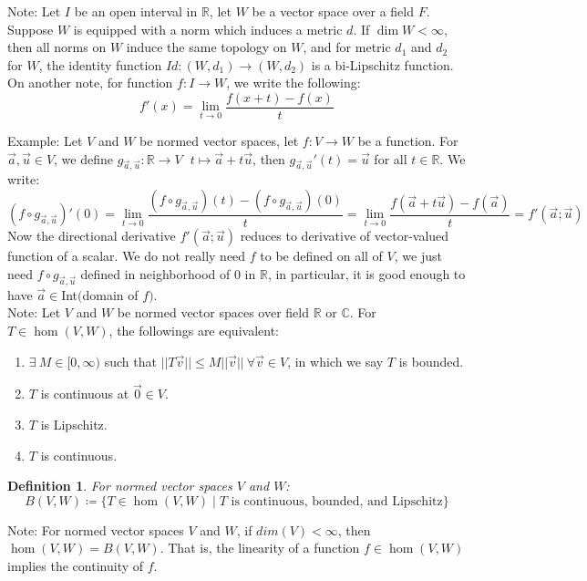 \documentclass[15pt]{book}
\theoremstyle{break}
\theoremstyle{break}
\newtheorem{defn}{Definition}[corL]
\newcommand{\R}{\mathbb{R}}
\newcommand{\Complex}{\mathbb{C}}
\newcommand{\note}{\color{red}Note: \color{black}}
\newcommand{\example}{\color{green}Example: \color{black}}
\begin{document}
\note
Let $I$ be an open interval in $\R$, let $W$ be a vector space over a field $F$. Suppose $W$ is equipped with a norm which induces a metric $d$. If $\dim W < \infty$, then all norms on $W$ induce the same topology on $W$, and for metric $d_1$ and $d_2$ for $W$, the identity function $Id:(W,d_1)\to (W,d_2)$ is a bi-Lipschitz function. On another note, for function $f:I \to W$, we write the following: 
$$f'(x)= \lim_{t\to 0} \frac{f(x+t)-f(x)}{t}$$

\example Let $V$ and $W$ be normed vector spaces, let $f:V \to W$ be a function. For $\vec{a},\vec{u} \in V$, we define $g_{\vec{a},\vec{u}}:\R \to V \ \ \ t\mapsto \vec{a}+t\vec{u}$, then $g_{\vec{a},\vec{u}}'(t) = \vec{u}$ for all $t \in \R$. We write: $$(f \circ g_{\vec{a},\vec{u}})'(0)=\lim_{t\to 0}\frac{(f\circ g_{\vec{a},\vec{u}})(t)-(f\circ g_{\vec{a},\vec{u}})(0)}{t} = \lim_{t\to 0} \frac{ f(\vec{a}+t\vec{u})-f(\vec{a})}{t} = f'(\vec{a};\vec{u})$$ Now the directional derivative $f'(\vec{a};\vec{u})$ reduces to derivative of vector-valued function of a scalar. We do not really need $f$ to be defined on all of $V$, we just need $f\circ g_{\vec{a},\vec{u}}$ defined in neighborhood of $0$ in $\R$, in particular, it is good enough to have $\vec{a} \in $Int$($domain of $f)$. \\

\note Let $V$ and $W$ be normed vector spaces over field $\R$ or $\Complex$. For $T \in \hom(V,W)$, the followings are equivalent:
\begin{enumerate}[topsep=3pt,itemsep=-1ex,partopsep=1ex,parsep=1ex]
\item  $\exists\ M \in [0,\infty)$ such that $||T\vec{v}|| \leq M||\vec{v}||\ \forall \vec{v}\in V$, in which we say $T$ is bounded.
\item  $T$ is continuous at $\vec{0}\in V$.
\item  $T$ is Lipschitz.
\item  $T$ is continuous.
\end{enumerate}

\begin{defn}
For normed vector spaces $V$ and $W$: $$B(V,W) \coloneqq \{ T \in \hom(V,W)\mid T \text{ is continuous, bounded, and Lipschitz}\}$$
\end{defn}

\note For normed vector spaces $V$ and $W$, if $dim(V)<\infty$, then $\hom(V,W)= B(V,W)$. That is, the linearity of a function $f \in \hom(V,W)$ implies the continuity of $f$.\\
\end{document}
